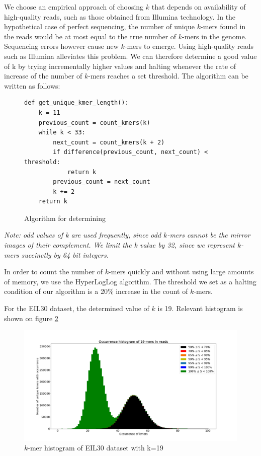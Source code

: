 We choose an empirical approach of choosing $k$ that depends on availability of high-quality reads, such as those obtained from Illumina technology. In the hypothetical case of perfect sequencing, the number of unique $k$-mers found in the reads would be at most equal to the true number of $k$-mers in the genome. Sequencing errors however cause new $k$-mers to emerge. Using high-quality reads such as Illumina alleviates this problem. We can therefore determine a good value of k by trying incrementally higher values and halting whenever the rate of increase of the number of $k$-mers reaches a set threshold. The algorithm can be written as follows:

\begin{figure}[H]
\lstset{language=Python}
\begin{lstlisting}[basicstyle=\small]
def get_unique_kmer_length():
    k = 11
    previous_count = count_kmers(k)
    while k < 33:
        next_count = count_kmers(k + 2)
        if difference(previous_count, next_count) < threshold:
            return k
        previous_count = next_count
        k += 2
    return k
\end{lstlisting}
\caption{Algorithm for determining }
\label{fig:unique_k_size}
\end{figure}

\textit{Note: odd values of k are used frequently, since odd $k$-mers cannot be the mirror images of their complement. We limit the k value by 32, since we represent $k$-mers succinctly by 64 bit integers.}

In order to count the number of $k$-mers quickly and without using large amounts of memory, we use the HyperLogLog algorithm\cite{flajolet2007hyperloglog}. The threshold we set as a halting condition of our algorithm is a 20\% increase in the count of $k$-mers.

For the EIL30 dataset, the determined value of $k$ is 19. Relevant histogram is shown on figure \ref{fig:k19}

\begin{figure}
\includegraphics[width=400bp]{figures/19mers.png}
\caption{$k$-mer histogram of EIL30 dataset with k=19}
\label{fig:k19}
\end{figure}

